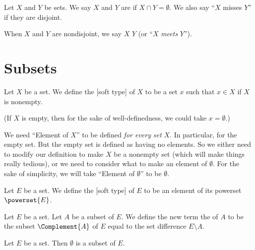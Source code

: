 \begin{definition}
Let $X$ and $Y$ be sets. We say $X$ and $Y$ are  if
$X\cap Y=\emptyset$. We also say ``$X$ misses $Y$'' if they are disjoint.

When $X$ and $Y$ are nondisjoint, we say $X$  $Y$
(or ``$X$ \emph{meets} $Y$'').
\end{definition}

\section{Subsets}

\begin{definition}
Let $X$ be a set.
We define the [soft type]  of $X$ to be a set $x$ such
that $x\in X$ if $X$ is nonempty.

(If $X$ is empty, then for the sake of well-definedness, we could take $x=\emptyset$.)
\end{definition}

\begin{remark}
We need ``Element of $X$'' to be defined \emph{for every set} $X$.
In particular, for the empty set. But the empty set is defined as
having no elements. So we either need to modify our definition to make
$X$ be a nonempty set (which will make things really tedious), or we
need to consider what to make an element of $\emptyset$. For the sake
of simplicity, we will take ``Element of $\emptyset$'' to be $\emptyset$.
\end{remark}

\begin{definition}
Let $E$ be a set.
We define the [soft type]  of $E$ to be an element of
its powerset $\powerset{E}$. 
\end{definition}

\begin{definition}
Let $E$ be a set. Let $A$ be a subset of $E$.
We define the new term the  of $A$ to be the subset
$\Complement{A}$ of $E$ equal to the set difference $E\setminus A$.
\end{definition}

\begin{theorem}\label{subset_1:1}%
Let $E$ be a set. Then $\emptyset$ is a subset of $E$.
\end{theorem}

